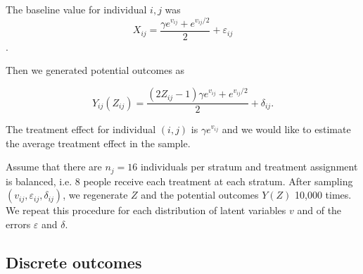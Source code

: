 \documentclass[12pt]{article}
\newcommand{\todo}[1]{{\color{red}{TO DO: \sc #1}}}
\begin{document}
The baseline value for individual $i,j$ was 
$$ X_{ij} = \frac{\gamma e^{v_{ij}} + e^{v_{ij}/2}}{2} + \varepsilon_{ij}$$.

Then we generated potential outcomes as

$$Y_{ij}(Z_{ij}) = \frac{(2Z_{ij} - 1)\gamma e^{v_{ij}} + e^{v_{ij}/2}}{2} + \delta_{ij}.$$

The treatment effect for individual $(i, j)$ is $\gamma e^{v_{ij}}$ and we would like to estimate the average treatment effect in the sample.

Assume that there are $n_j=16$ individuals per stratum and treatment assignment is balanced, i.e. 8 people receive each treatment at each stratum.
After sampling $(v_{ij}, \varepsilon_{ij}, \delta_{ij})$, we regenerate $Z$ and the potential outcomes $Y(Z)$ 10,000 times.
We repeat this procedure for each distribution of latent variables $v$ and of the errors $\varepsilon$ and $\delta$.

\todo{insert figures and table}


\todo{what's the correlation between $X$ and $Y$?}
\subsection{Discrete outcomes}
\end{document}
